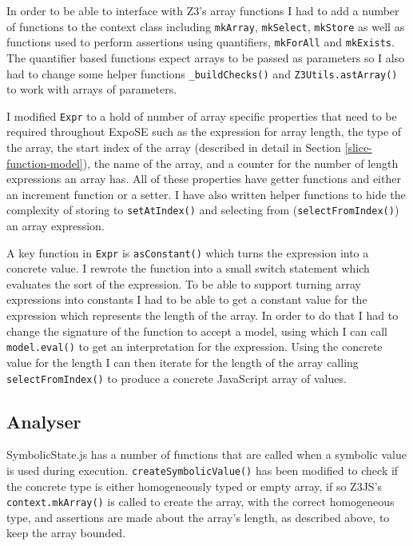 \documentclass[]{final_report}
\begin{document}
In order to be able to interface with Z3’s array functions I had to add a number of functions to the context class including \lstinline|mkArray|, \lstinline|mkSelect|, \lstinline|mkStore| as well as functions used to perform assertions using quantifiers, \lstinline|mkForAll| and \lstinline|mkExists|. The quantifier based functions expect arrays to be passed as parameters so I also had to change some helper functions \lstinline|_buildChecks()| and \lstinline|Z3Utils.astArray()| to work with arrays of parameters.

I modified \lstinline|Expr| to a hold of number of array specific properties that need to be required throughout ExpoSE such as the expression for array length, the type of the array, the start index of the array (described in detail in Section \ref{slice-function-model}), the name of the array, and a counter for the number of length expressions an array has. All of these properties have getter functions and either an increment function or a setter. I have also written helper functions to hide the complexity of storing to \lstinline|setAtIndex()| and selecting from (\lstinline|selectFromIndex()|) an array expression.

A key function in \lstinline{Expr} is \lstinline{asConstant()} which turns the expression into a concrete value. I rewrote the function into a small switch statement which evaluates the sort of the expression. To be able to support turning array expressions into constants I had to be able to get a constant value for the expression which represents the length of the array. In order to do that I had to change the signature of the function to accept a model, using which I can call \lstinline{model.eval()} to get an interpretation for the expression. Using the concrete value for the length I can then iterate for the length of the array calling \lstinline{selectFromIndex()} to produce a concrete JavaScript array of values.

\subsection{Analyser}
SymbolicState.js has a number of functions that are called when a symbolic value is used during execution. \lstinline{createSymbolicValue()} has been modified to check if the concrete type is either homogeneously typed or empty array, if so Z3JS’s \lstinline{context.mkArray()} is called to create the array, with the correct homogeneous type, and assertions are made about the array’s length, as described above, to keep the array bounded.
\end{document}
